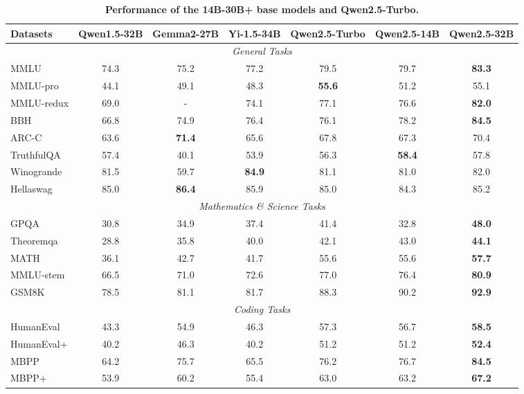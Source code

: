 \begin{table}[tbp]
\centering
\caption{\textbf{Performance of the 14B-30B+ base models and Qwen2.5-Turbo.}}
\label{tab:base-14B}
\small %
\setlength{\tabcolsep}{3pt} %
\renewcommand{\arraystretch}{0.9} 
\begin{tabular}{@{}lcccccc@{}}
\toprule
\textbf{Datasets} & \textbf{Qwen1.5-32B} & \textbf{Gemma2-27B} & \textbf{Yi-1.5-34B} & \textbf{Qwen2.5-Turbo} & \textbf{Qwen2.5-14B} & \textbf{Qwen2.5-32B} \\
\midrule
\multicolumn{7}{c}{\textit{General Tasks}} \\
\midrule
MMLU          & 74.3 & 75.2 & 77.2 & 79.5 & 79.7 & \textbf{83.3} \\
MMLU-pro      & 44.1 & 49.1 & 48.3 & \textbf{55.6} & 51.2 & 55.1 \\
MMLU-redux    & 69.0 & -    & 74.1 & 77.1 & 76.6 & \textbf{82.0} \\
BBH           & 66.8 & 74.9 & 76.4 & 76.1 & 78.2 & \textbf{84.5} \\
ARC-C         & 63.6 & \textbf{71.4} & 65.6 & 67.8 & 67.3 & 70.4 \\
TruthfulQA    & 57.4 & 40.1 & 53.9 & 56.3 & \textbf{58.4} & 57.8 \\
Winogrande    & 81.5 & 59.7 & \textbf{84.9} & 81.1 & 81.0    & 82.0 \\
Hellaswag     & 85.0 & \textbf{86.4} & 85.9 & 85.0 & 84.3    & 85.2 \\
\midrule
\multicolumn{7}{c}{\textit{Mathematics \& Science Tasks}} \\
\midrule
GPQA          & 30.8 & 34.9 & 37.4 & 41.4 & 32.8 & \textbf{48.0} \\
Theoremqa     & 28.8 & 35.8 & 40.0 & 42.1 & 43.0 & \textbf{44.1} \\
MATH          & 36.1 & 42.7 & 41.7 & 55.6 & 55.6 & \textbf{57.7} \\
MMLU-stem     & 66.5 & 71.0 & 72.6 & 77.0 & 76.4 & \textbf{80.9} \\
GSM8K         & 78.5 & 81.1 & 81.7 & 88.3 & 90.2 & \textbf{92.9} \\
\midrule
\multicolumn{7}{c}{\textit{Coding Tasks}} \\
\midrule
HumanEval     & 43.3 & 54.9 & 46.3 & 57.3 & 56.7 & \textbf{58.5} \\
HumanEval+    & 40.2 & 46.3 & 40.2 & 51.2 & 51.2 & \textbf{52.4} \\
MBPP          & 64.2 & 75.7 & 65.5 & 76.2 & 76.7 & \textbf{84.5} \\
MBPP+         & 53.9 & 60.2 & 55.4 & 63.0 & 63.2 & \textbf{67.2} \\

\end{tabular}
\end{table}
